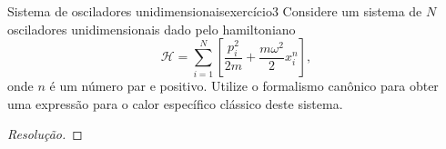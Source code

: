\begin{exercício}{Sistema de osciladores unidimensionais}{exercício3}
    Considere um sistema de \(N\) osciladores unidimensionais dado pelo hamiltoniano
    \begin{equation*}
        \mathcal{H} = \sum_{i = 1}^N\left[\frac{p_i^2}{2m} + \frac{m\omega^2}{2}x_i^n\right],
    \end{equation*}
    onde \(n\) é um número par e positivo. Utilize o formalismo canônico para obter uma expressão para o calor específico clássico deste sistema.
\end{exercício}
\begin{proof}[Resolução]

\end{proof}

